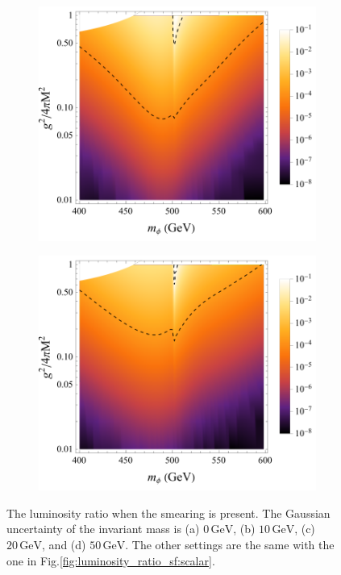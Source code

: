 \documentclass[11pt]{article}
\theoremstyle{definition}
\theoremstyle{remark}
\begin{document}
\begin{figure}[h]
\begin{subfigure}{0.4\textwidth}
		\includegraphics[width=0.9\linewidth]{scalar_20GeV.pdf}
		\caption{}
		\label{fig:luminosity_ratio_scalar:20}
		\end{subfigure}
		\begin{subfigure}{0.4\textwidth}
		\centering
		\includegraphics[width=0.9\linewidth]{scalar_50GeV.pdf}
		\caption{}
		\label{fig:luminosity_ratio_scalar:50}
		\end{subfigure}
		\captionsetup{width=.9\linewidth}
		\caption{The luminosity ratio when the smearing is present. The Gaussian uncertainty of the invariant mass is (a) $0\,\mathrm{GeV}$, (b) $10\,\mathrm{GeV}$, (c) $20\,\mathrm{GeV}$, and (d) $50\,\mathrm{GeV}$. The other settings are the same with the one in Fig.\ref{fig:luminosity_ratio_sf:scalar}.}
		\label{fig:luminosity_ratio_scalar}
	\end{figure}
	
\end{document}
